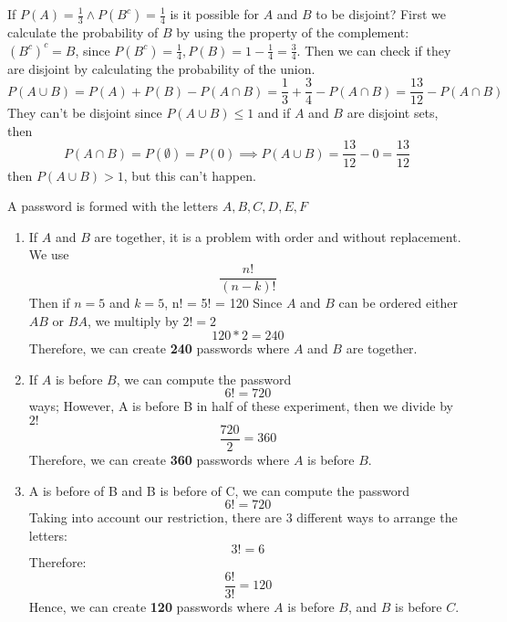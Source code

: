 \documentclass{article}
\begin{document}
    \begin{minipage}{\linewidth}
        \hspace*{-\parindent}
        \begin{solutions}
            If $P(A) = \frac{1}{3} \land P(B^c) = \frac{1}{4}$ is it possible for $A$ and $B$ to be disjoint? First we calculate the probability of $B$ by using the property of the complement: $(B^c)^c = B$, since $P(B^c) = \frac{1}{4}, P(B) = 1 - \frac{1}{4} = \frac{3}{4}$. Then we can check if they are disjoint by calculating the probability of the union.
            \[
                P(A \cup B) = P(A) + P(B) - P(A \cap B) = \frac{1}{3} + \frac{3}{4} - P(A \cap B)= \frac{13}{12} - P(A \cap B) 
            \]
            They can't be disjoint since $P(A \cup B) \leq 1$ and if $A$ and $B$ are disjoint sets, then
            \[
                P(A \cap B) = P(\emptyset) = P(0) \implies P(A \cup B) = \frac{13}{12} - 0 = \frac{13}{12}
            \]
            then $P(A \cup B) > 1$, but this can't happen.
            \medskip           
        \end{solutions}
    
    
        \begin{solutions}
        A password is formed with the letters ${A, B, C, D, E, F}$
            \begin{enumerate}[label=\alph*)]
                \item If $A$ and $B$ are together, it is a problem with order and without replacement. We use 
                \[
                    \frac{n!}{(n-k)!}
                \]
                Then if $n=5$ and $k=5$, n! = 5! = 120               
                Since $A$ and $B$ can be ordered either $AB$ or $BA$, we multiply by $2! = 2$
                 \[
                    120 * 2 = 240
                 \]
                Therefore, we can create \textbf{240} passwords where $A$ and $B$ are together.
                
                \item If $A$ is before $B$, we can compute the password 
                \[
                    6! = 720 
                \] 
                ways; However, A is before B in half of these experiment, then we divide by $2!$
                \[
                    \frac{720}{2} = 360
                \]
                Therefore, we can create \textbf{360} passwords where $A$ is before $B$.
                
                \item A is before of B and B is before of C, we can compute the password
                \[
                    6! = 720
                \]
                Taking into account our restriction, there are 3 different ways to arrange the letters: 
                \[
                    3! = 6
                \]
                Therefore:
                \[
                    \frac{6!}{3!} = 120
                \]
                Hence, we can create \textbf{120} passwords where $A$ is before $B$, and $B$ is before $C$.
                

\end{enumerate}
\end{solutions}
\end{minipage}
\end{document}

